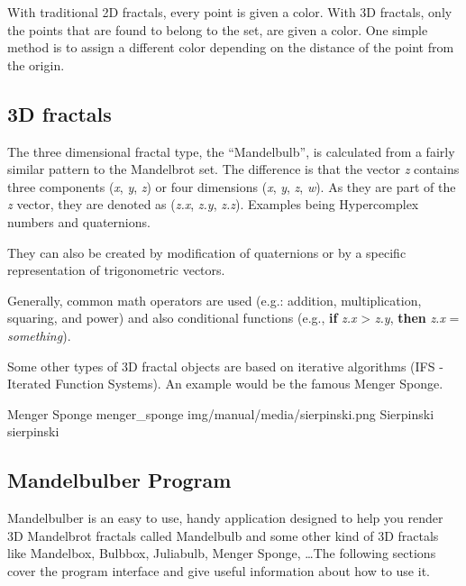 With traditional 2D fractals, every point is given a color. With 3D fractals,
only the points that are found to belong to the set, are given a color.
One simple method is to assign a different color depending on the distance of the point from the origin.

\subsection{3D fractals}\label{d-fractals}

The three dimensional fractal type, the ``Mandelbulb'', is calculated from a
fairly similar pattern to the Mandelbrot set. The difference is that the vector
\emph{z} contains three components (\emph{x}, \emph{y}, \emph{z}) or four
dimensions (\emph{x}, \emph{y}, \emph{z}, \emph{w}). As they are part of the
\emph{z} vector, they are denoted as (\emph{z.x}, \emph{z.y}, \emph{z.z}).
Examples being Hypercomplex numbers and quaternions.

They can also be created by modification of quaternions or by a specific
representation of trigonometric vectors. 

Generally, common math operators are
used (e.g.: addition, multiplication, squaring, and power) and also
conditional functions (e.g., \textbf{if} \emph{z.x} \textgreater{} \emph{z.y},
\textbf{then} \emph{z.x} = \emph{something}).

Some other types of 3D fractal objects are based on iterative algorithms (IFS -
Iterated Function Systems). An example would be the famous Menger Sponge.
\nopagebreak

{Menger Sponge}
{menger_sponge}
{img/manual/media/sierpinski.png}
{Sierpinski}
{sierpinski}

\subsection{Mandelbulber Program}\label{mandelbulber-program}

Mandelbulber is an easy to use, handy application designed to help you render 3D
Mandelbrot fractals called Mandelbulb and some other kind of 3D fractals like
Mandelbox, Bulbbox, Juliabulb, Menger Sponge, \dots The following sections
cover the program interface and give useful information about how to use it.
